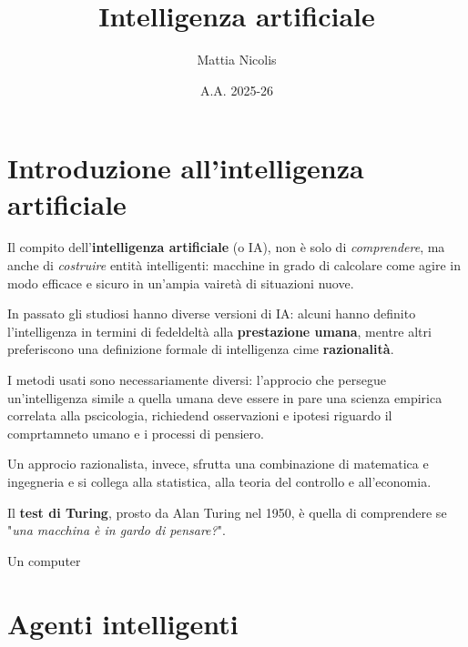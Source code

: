 \documentclass[a4paper, 12pt]{book}
\title{\textbf{Intelligenza artificiale}}
\author{Mattia Nicolis}
\date{A.A. 2025-26}
\begin{document}
    \maketitle

    \tableofcontents
    \markboth{}{}

    \chapter*{Introduzione all'intelligenza artificiale}
    Il compito dell'\textbf{intelligenza artificiale} (o IA), non è solo di \textit{comprendere}, ma anche di \textit{costruire} entità intelligenti: macchine in grado di calcolare come agire in modo efficace e sicuro in un'ampia vairetà di situazioni nuove.

    In passato gli studiosi hanno diverse versioni di IA: alcuni hanno definito l'intelligenza in termini di fedeldeltà alla \textbf{prestazione umana}, mentre altri preferiscono una definizione formale di intelligenza cime \textbf{razionalità}.

    I metodi usati sono necessariamente diversi: l'approcio che persegue un'intelligenza simile a quella umana deve essere in pare una scienza empirica correlata alla pscicologia, richiedend osservazioni e ipotesi riguardo il comprtamneto umano e i processi di pensiero.

    Un approcio razionalista, invece, sfrutta una combinazione di matematica e ingegneria e si collega alla statistica, alla teoria del controllo e all'economia.

    \begin{tcolorbox}[
      colback=cyan!5!white,
      colframe=blue!50!black,
      title=\textbf{Test di Turing},
      coltitle=white,
      fonttitle=\bfseries,
      arc=3mm,
      boxrule=0.5pt,
      enhanced,
      breakable
    ]
    Il \textbf{test di Turing}, prosto da Alan Turing nel 1950, è quella di comprendere se "\textit{una macchina è in gardo di pensare?}".

    Un computer
    \end{tcolorbox}

    \chapter*{Agenti intelligenti}
\end{document}
